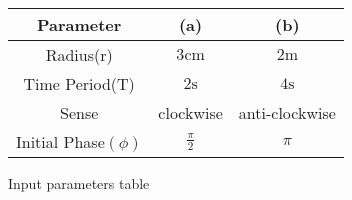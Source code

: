 \centering
\begin{tabular}{|c|c|c|}
        \hline
        \textbf{Parameter} & \textbf{(a)} & \textbf{(b)} \\
        \hline
	Radius(r) & $3\text{cm}$ & $2\text{m}$ \\
        \hline
	Time Period(T) & $2\text{s}$ & $4\text{s}$ \\
	\hline
	Sense & clockwise & anti-clockwise\\
	\hline
	Initial Phase$(\phi)$ & $\frac{\pi}{2}$ & $\pi$ \\
	\hline
\end{tabular}
\caption{Input parameters table}
\label{tab:11.14.11}
